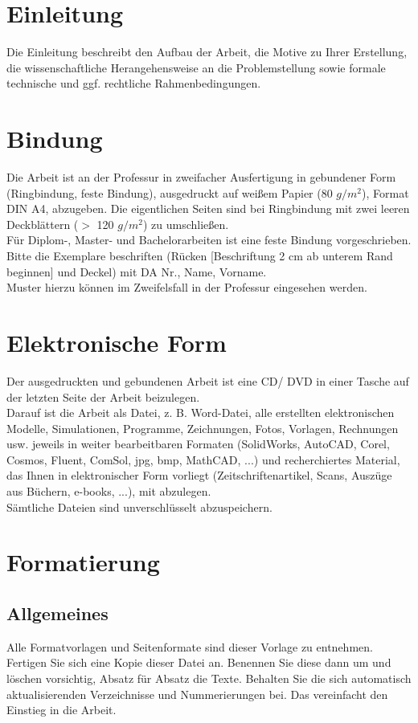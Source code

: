 \section{Einleitung}
Die Einleitung beschreibt den Aufbau der Arbeit, die Motive zu Ihrer Erstellung, die wissenschaftliche Herangehensweise an die Problemstellung sowie formale technische und ggf. rechtliche Rahmenbedingungen.

\section{Bindung}
Die Arbeit ist an der Professur in zweifacher Ausfertigung in gebundener Form (Ringbindung, feste Bindung), ausgedruckt auf weißem Papier (80 $g/m^{2}$), Format DIN A4, abzugeben. Die eigentlichen Seiten sind bei Ringbindung mit zwei leeren Deckblättern ($>$ 120 $g/m^{2}$) zu umschließen.\\
Für Diplom-, Master- und Bachelorarbeiten ist eine feste Bindung vorgeschrieben. Bitte die Exemplare beschriften (Rücken [Beschriftung 2 cm ab unterem Rand beginnen] und Deckel) mit DA Nr., Name, Vorname. \\
Muster hierzu können im Zweifelsfall in der Professur eingesehen werden.

\section{Elektronische Form}
Der ausgedruckten und gebundenen Arbeit ist eine CD/ DVD in einer Tasche auf der letzten Seite der Arbeit beizulegen. \\
Darauf ist die Arbeit als Datei, z. B. Word-Datei, alle erstellten elektronischen Modelle, Simulationen, Programme, Zeichnungen, Fotos, Vorlagen, Rechnungen usw. jeweils in weiter bearbeitbaren Formaten (SolidWorks, AutoCAD, Corel, Cosmos, Fluent, ComSol, jpg, bmp, MathCAD, ...) und recherchiertes Material, das Ihnen in elektronischer Form vorliegt (Zeitschriftenartikel, Scans, Auszüge aus Büchern, e-books, ...), mit abzulegen. \\
Sämtliche Dateien sind unverschlüsselt abzuspeichern.

\section{Formatierung}
\subsection{Allgemeines}
Alle Formatvorlagen und Seitenformate sind dieser Vorlage zu entnehmen. Fertigen Sie sich eine Kopie dieser Datei an. Benennen Sie diese dann um und löschen vorsichtig, Absatz für Absatz die Texte. Behalten Sie die sich automatisch aktualisierenden Verzeichnisse und Nummerierungen bei. Das vereinfacht den Einstieg in die Arbeit.

